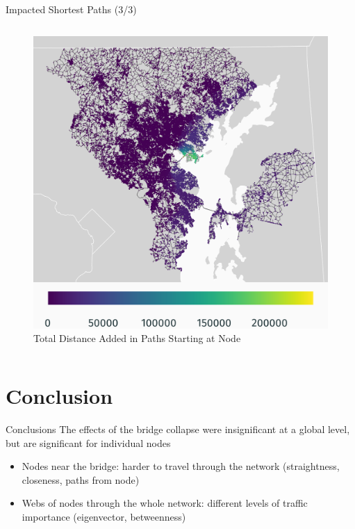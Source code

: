 \documentclass{beamer}
\numberwithin{figure}{section} %
\numberwithin{table}{section} %
\begin{document}
\begin{frame}{Impacted Shortest Paths (3/3)}
\begin{columns}
        \begin{column}{0.5\textwidth}
            \begin{figure}
                \centering
                \includegraphics[width=\textwidth]{maps/dist_changed_paths.png}
                {\scriptsize Total Distance Added in Paths Starting at Node}
            \end{figure}
        \end{column}
    \end{columns}
\end{frame}


\section{Conclusion}

\begin{frame}{Conclusions}
    The effects of the bridge collapse were insignificant at a global level, but are significant for individual nodes
    \begin{itemize}
        \item Nodes near the bridge: harder to travel through the network (straightness, closeness, paths from node)
        \item Webs of nodes through the whole network: different levels of traffic importance (eigenvector, betweenness)
    \end{itemize}
\end{frame}
\end{document}
